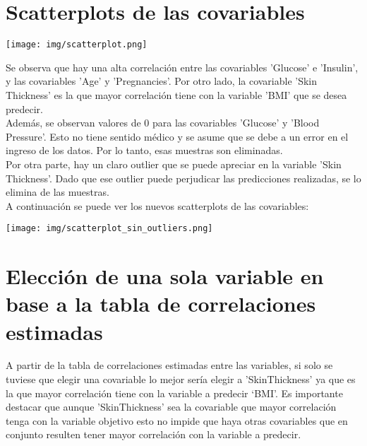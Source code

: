 \documentclass{article}
\begin{document}
\section{Scatterplots de las covariables}

\begin{center}
    \texttt{[image: img/scatterplot.png]}
\end{center}

\noindent
Se observa que hay una alta correlación entre las covariables 'Glucose' e 'Insulin', y las covariables 'Age' y 'Pregnancies'. Por otro lado, la covariable 'Skin Thickness' es la que mayor correlación tiene con la variable 'BMI' que se desea predecir.\\

\noindent
Además, se observan valores de 0 para las covariables 'Glucose' y 'Blood Pressure'. Esto no tiene sentido médico y se asume que se debe a un error en el ingreso de los datos. Por lo tanto, esas muestras son eliminadas.\\

\noindent
Por otra parte, hay un claro outlier que se puede apreciar en la variable 'Skin Thickness'. Dado que ese outlier puede perjudicar las predicciones realizadas, se lo elimina de las muestras.\\

\noindent
A continuación se puede ver los nuevos scatterplots de las covariables:

\begin{center}
    \texttt{[image: img/scatterplot\_sin\_outliers.png]}
\end{center}



\section{Elección de una sola variable en base a la tabla de correlaciones estimadas}

\noindent
A partir de la tabla de correlaciones estimadas entre las variables, si solo se tuviese que elegir una covariable lo mejor sería elegir a 'SkinThickness' ya que es la que mayor correlación tiene con la variable a predecir ‘BMI’. Es importante destacar que aunque 'SkinThickness' sea la covariable que mayor correlación tenga con la variable objetivo esto no impide que haya otras covariables que en conjunto resulten tener mayor correlación con la variable a predecir.
\end{document}
